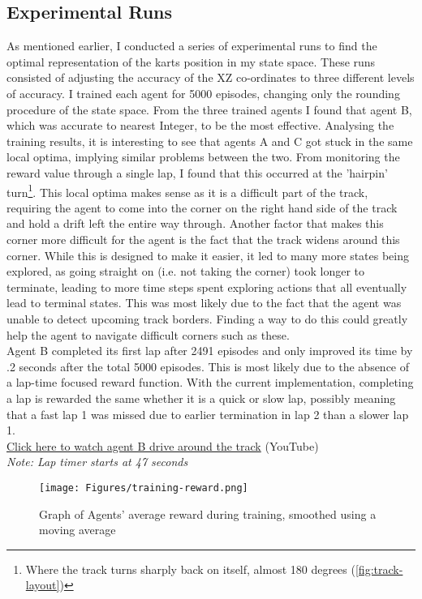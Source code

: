 \subsection{Experimental Runs}
As mentioned earlier, I conducted a series of experimental runs to find the optimal representation of the karts position in my state space. These runs consisted of adjusting the accuracy of the XZ co-ordinates to three different levels of accuracy. I trained each agent for 5000 episodes, changing only the rounding procedure of the state space. From the three trained agents I found that agent B, which was accurate to nearest Integer, to be the most effective. Analysing the training results, it is interesting to see that agents A and C got stuck in the same local optima, implying similar problems between the two. From monitoring the reward value through a single lap, I found that this occurred at the 'hairpin' turn\footnote{Where the track turns sharply back on itself, almost 180 degrees (\ref{fig:track-layout})}. This local optima makes sense as it is a difficult part of the track, requiring the agent to come into the corner on the right hand side of the track and hold a drift left the entire way through. Another factor that makes this corner more difficult for the agent is the fact that the track widens around this corner. While this is designed to make it easier, it led to many more states being explored, as going straight on (i.e. not taking the corner) took longer to terminate, leading to more time steps spent exploring actions that all eventually lead to terminal states. This was most likely due to the fact that the agent was unable to detect upcoming track borders. Finding a way to do this could greatly help the agent to navigate difficult corners such as these.\\ Agent B completed its first lap after 2491 episodes and only improved its time by .2 seconds after the total 5000 episodes. This is most likely due to the absence of a lap-time focused reward function. With the current implementation, completing a lap is rewarded the same whether it is a quick or slow lap, possibly meaning that a fast lap 1 was missed due to earlier termination in lap 2 than a slower lap 1.
\\\href{https://youtu.be/CMENnIKdkOg}{Click here to watch agent B drive around the track} (YouTube)\\ \textit{Note: Lap timer starts at 47 seconds}
\begin{figure}[htb]
    \centering
    \texttt{[image: Figures/training-reward.png]}
    \caption{Graph of Agents' average reward during training, smoothed using a moving average}
    \label{fig:training-graph}
\end{figure}
